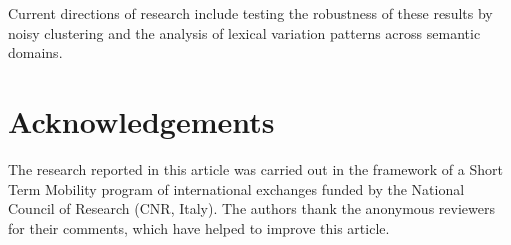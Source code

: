 \documentclass[output=paper]{LSP/langsci}
\begin{document}
Current directions of research include testing the robustness of these results by noisy clustering and the analysis of lexical variation patterns across semantic domains.

\section*{Acknowledgements}
The research reported in this article was carried out in  the framework  of  a  Short  Term  Mobility  program   of international   exchanges   funded   by   the National Council of Research (CNR, Italy). The authors thank the anonymous reviewers for their comments,  which  have  helped  to  improve  this  article.


\printbibliography[heading=subbibliography,notkeyword=this]
\end{document}
